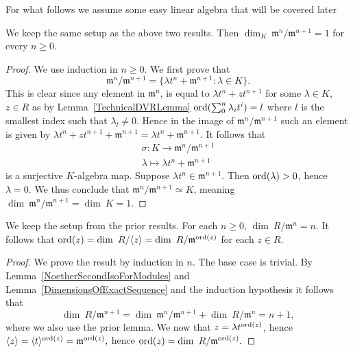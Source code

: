     For what follows we assume some easy linear algebra that will be covered later
    \begin{lemma}
        We keep the same setup as the above two results. Then $\dim_K\ \mathfrak{m}^n/\mathfrak{m}^{n+1} = 1$ for every $n\geq 0$. 
    \end{lemma}
    \begin{proof}
        We use induction in $n\geq 0$. We first prove that 
        $$\mathfrak{m}^n/\mathfrak{m}^{n+1} = \{ \lambda t^n + \mathfrak{m}^{n+1} : \lambda\in K\}.$$
        This is clear since any element in $\mathfrak{m}^n$, is equal to $\lambda t^n + zt^{n+1}$ for some $\lambda\in K$, $z\in R$ as by Lemma~\ref{TechnicalDVRLemma} $\mathrm{ord}(\sum_0^n\lambda_it^i) = l$ where $l$ is the smallest index such that $\lambda_l\neq 0$. Hence in the image of $\mathfrak{m}^n/\mathfrak{m}^{n+1}$ such an element is given by $\lambda t^n + zt^{n+1} + \mathfrak{m}^{n+1} = \lambda t^n + \mathfrak{m}^{n+1}$. It follows that 
        \begin{gather*}
            \sigma : K \rightarrow \mathfrak{m}^n/\mathfrak{m}^{n+1}\\
            \lambda \mapsto \lambda t^n+\mathfrak{m}^{n+1}
        \end{gather*}
        is a surjective $K$-algebra map. Suppose $\lambda t^n \in \mathfrak{m}^{n+1}$. Then $\mathrm{ord}(\lambda)>0$, hence $\lambda = 0$. We thus conclude that $\mathfrak{m}^n/\mathfrak{m}^{n+1} \simeq K$, meaning $\dim \ \mathfrak{m}^n/\mathfrak{m}^{n+1} = \dim\ K = 1.$
    \end{proof}
    \begin{lemma}\label{OrderIsDimensionOfQuotientKAlg}
        We keep the setup from the prior results. For each $n\geq 0$, $\dim\ R/\mathfrak{m}^n = n$. It follows that $\mathrm{ord}(z) = \dim\ R/\langle z\rangle =  \dim\ R/\mathfrak{m}^{\mathrm{ord}(z)}$ for each $z\in R$.
    \end{lemma}
    \begin{proof}
        We prove the result by induction in $n$. The base case is trivial. By Lemma~\ref{NoetherSecondIsoForModules} and Lemma~\ref{DimensionsOfExactSequence} and the induction hypothesis it follows that 
        $$\dim\ R/\mathfrak{m}^{n+1} = \dim\ \mathfrak{m}^n/\mathfrak{m}^{n+1}+\dim\ R/\mathfrak{m}^n = n+1,$$
        where we also use the prior lemma. We now that $z = \lambda t^{\mathrm{ord}(z)}$, hence $\langle z \rangle = \langle t\rangle^{\mathrm{ord}(z)} = \mathfrak{m}^{\mathrm{ord}(z)},$ hence $\mathrm{ord}(z) = \dim \ R/\mathfrak{m}^{\mathrm{ord}(z)}.$
    \end{proof}
